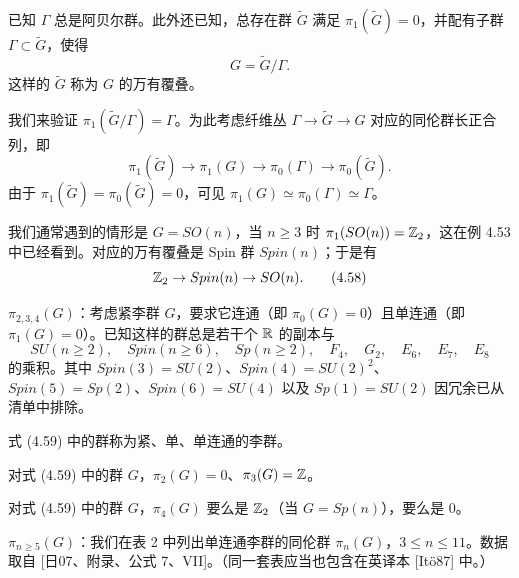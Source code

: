 \begin{qmbox}
已知 $\Gamma$ 总是阿贝尔群。此外还已知，总存在群 $\tilde G$ 满足 $\pi_1(\tilde G)=0$，并配有子群 $\Gamma\subset\tilde G$，使得
\begin{equation}
G=\tilde G/\Gamma.
\tag{4.56}
\end{equation}
这样的 $\tilde G$ 称为 $G$ 的万有覆叠。
\end{qmbox}

我们来验证 $\pi_1(\tilde G/\Gamma)=\Gamma$。为此考虑纤维丛 $\Gamma\to\tilde G\to G$ 对应的同伦群长正合列，即
\begin{equation}
\pi_1(\tilde G)\to\pi_1(G)\to\pi_0(\Gamma)\to\pi_0(\tilde G).
\tag{4.57}
\end{equation}
由于 $\pi_1(\tilde G)=\pi_0(\tilde G)=0$，可见 $\pi_1(G)\simeq\pi_0(\Gamma)\simeq\Gamma$。

我们通常遇到的情形是 $G=SO(n)$，当 $n\ge 3$ 时 $\pi_1(SO(n))=\mathbb{Z}_2$，这在例 4.53 中已经看到。对应的万有覆叠是 Spin 群 $Spin(n)$；于是有
\begin{equation}
\mathbb{Z}_2\to Spin(n)\to SO(n).
\tag{4.58}
\end{equation}

\noindent$\pi_{2,3,4}(G)$：考虑紧李群 $G$，要求它连通（即 $\pi_0(G)=0$）且单连通（即 $\pi_1(G)=0$）。已知这样的群总是若干个 $\mathbb{R}$ 的副本与
\begin{equation}
SU(n\ge 2),\quad Spin(n\ge 6),\quad Sp(n\ge 2),\quad F_4,\quad G_2,\quad E_6,\quad E_7,\quad E_8
\tag{4.59}
\end{equation}
的乘积。其中 $Spin(3)=SU(2)$、$Spin(4)=SU(2)^2$、$Spin(5)=Sp(2)$、$Spin(6)=SU(4)$ 以及 $Sp(1)=SU(2)$ 因冗余已从清单中排除。

式 (4.59) 中的群称为紧、单、单连通的李群。

\begin{qmbox}
对式 (4.59) 中的群 $G$，$\pi_2(G)=0$、$\pi_3(G)=\mathbb{Z}$。
\end{qmbox}

\begin{qmbox}
对式 (4.59) 中的群 $G$，$\pi_4(G)$ 要么是 $\mathbb{Z}_2$（当 $G=Sp(n)$），要么是 $0$。
\end{qmbox}

\noindent$\pi_{n\ge 5}(G)$：我们在表 2 中列出单连通李群的同伦群 $\pi_n(G)$，$3\le n\le 11$。数据取自 [日07、附录、公式 7、VII]。（同一套表应当也包含在英译本 [Itö87] 中。）

